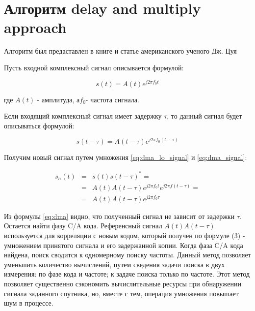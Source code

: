 \section{Алгоритм delay and multiply approach}

Алгоритм был предаставлен в книге и статье американского ученого Дж.
Цуя \cite{lin_dma, tsui}

Пусть входной комплексный сигнал описывается формулой:

\begin{center}
\begin{equation}
	s(t)=A(t)e^{j2{\pi}f_{0}t}\label{eq:dma_lo_signal}
\end{equation}
\end{center}

где $A(t)$ - амплитуда, а$f_{0}$- частота сигнала.

Если входящий комплексный сигнал имеет задержку $\tau$, то данный
сигнал будет описываться формулой: 

\begin{center}
\begin{equation}
	\label{eq:dma_signal}
	s(t-\tau)=A(t-\tau)e^{j2{\pi}f_{0}(t-\tau)}
\end{equation}
\end{center}

Получим новый сигнал путем умножения \ref{eq:dma_lo_signal} и \ref{eq:dma_signal}:

\begin{center}
\begin{eqnarray}
s_{n}(t) & = & s(t)s(t-\tau)^{*}=\nonumber \\
 & = & A(t)A(t-\tau)e^{j2\pi f_{0}t}e^{j2\pi f(t-\tau)}=\label{eq:dma}\\
 & = & A(t)A(t-\tau)e^{j2\pi f_{0}\tau}\nonumber 
\end{eqnarray}

\par\end{center}

Из формулы \ref{eq:dma} видно, что полученный сигнал не зависит от
задержки $\tau$. Остается найти фазу C/A кода. Референсный сигнал
$A(t)A(t-\tau)$ используется для корреляции с новым кодом, который
получен по формуле (3) - умножением принятого сигнала и его задержанной
копии. Когда фаза C/A кода найдена, поиск сводится к одномерному поиску
частоты. Данный метод позволяет уменьшить количество вычислений, путем
сведения задачи поиска в двух измерения: по фазе кода и частоте; к
задаче поиска только по частоте. Этот метод позволяет существенно
сэкономить вычислительные ресурсы при обнаружении сигнала заданного
спутника, но, вместе с тем, операция умножения повышает шум в процессе.

